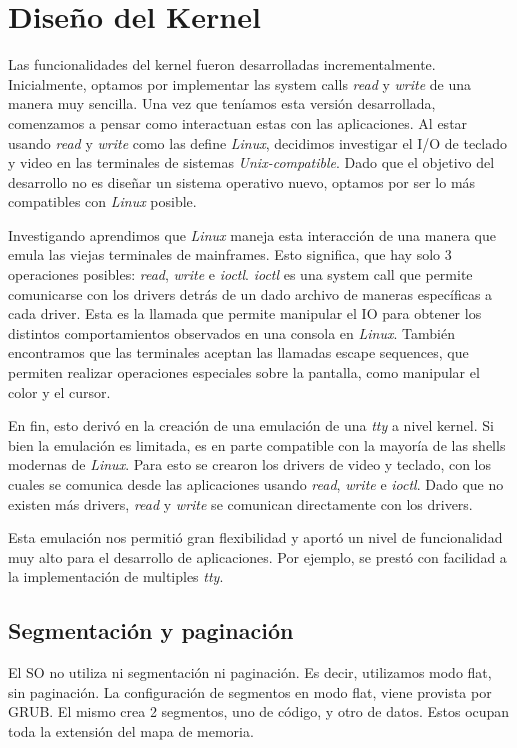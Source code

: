 \documentclass[a4paper,10pt]{article}
\begin{document}
\newpage
\section{Diseño del Kernel}
    Las funcionalidades del kernel fueron desarrolladas incrementalmente.
    Inicialmente, optamos por implementar las system calls \textit{read} y \textit{write} de una manera muy sencilla.
    Una vez que teníamos esta versión desarrollada, comenzamos a pensar como interactuan estas con las aplicaciones.
    Al estar usando \textit{read} y \textit{write} como las define \textit{Linux}, decidimos investigar el I/O de teclado y video en las terminales de sistemas \textit{Unix-compatible}.
    Dado que el objetivo del desarrollo no es diseñar un sistema operativo nuevo, optamos por ser lo más compatibles con \textit{Linux} posible.

    Investigando aprendimos que \textit{Linux} maneja esta interacción de una manera que emula las viejas terminales de mainframes.
    Esto significa, que hay solo 3 operaciones posibles: \textit{read}, \textit{write} e \textit{ioctl}.
    \textit{ioctl} es una system call que permite comunicarse con los drivers detrás de un dado archivo de maneras específicas a cada driver.
    Esta es la llamada que permite manipular el IO para obtener los distintos comportamientos observados en una consola en \textit{Linux}.
    También encontramos que las terminales aceptan las llamadas escape sequences, que permiten realizar operaciones especiales sobre la pantalla, como manipular el color y el cursor.

    En fin, esto derivó en la creación de una emulación de una \textit{tty} a nivel kernel.
    Si bien la emulación es limitada, es en parte compatible con la mayoría de las shells modernas de \textit{Linux}.
    Para esto se crearon los drivers de video y teclado, con los cuales se comunica desde las aplicaciones usando \textit{read}, \textit{write} e \textit{ioctl}.
    Dado que no existen más drivers, \textit{read} y \textit{write} se comunican directamente con los drivers.

    Esta emulación nos permitió gran flexibilidad y aportó un nivel de funcionalidad muy alto para el desarrollo de aplicaciones.
    Por ejemplo, se prestó con facilidad a la implementación de multiples \textit{tty}.

    \subsection{Segmentación y paginación}
        El SO no utiliza ni segmentación ni paginación. 
        Es decir, utilizamos modo flat, sin paginación.
        La configuración de segmentos en modo flat, viene provista por GRUB.
        El mismo crea 2 segmentos, uno de código, y otro de datos.
        Estos ocupan toda la extensión del mapa de memoria.
\end{document}

